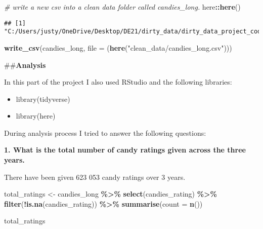 \documentclass[
]{article}
\newenvironment{Shaded}{\begin{snugshade}}{\end{snugshade}}
\newcommand{\AttributeTok}[1]{\textcolor[rgb]{0.13,0.29,0.53}{#1}}
\newcommand{\CommentTok}[1]{\textcolor[rgb]{0.56,0.35,0.01}{\textit{#1}}}
\newcommand{\FunctionTok}[1]{\textcolor[rgb]{0.13,0.29,0.53}{\textbf{#1}}}
\newcommand{\NormalTok}[1]{#1}
\newcommand{\OtherTok}[1]{\textcolor[rgb]{0.56,0.35,0.01}{#1}}
\newcommand{\SpecialCharTok}[1]{\textcolor[rgb]{0.81,0.36,0.00}{\textbf{#1}}}
\newcommand{\StringTok}[1]{\textcolor[rgb]{0.31,0.60,0.02}{#1}}
\begin{document}
\begin{Shaded}
\begin{Highlighting}[]
\CommentTok{\# write a new csv into a clean data folder called \textquotesingle{}candies\_long.\textquotesingle{}}
\NormalTok{here}\SpecialCharTok{::}\FunctionTok{here}\NormalTok{()}
\end{Highlighting}
\end{Shaded}

\begin{verbatim}
## [1] "C:/Users/justy/OneDrive/Desktop/DE21/dirty_data/dirty_data_project_codeclan_justynarosiak/task4"
\end{verbatim}

\begin{Shaded}
\begin{Highlighting}[]
\FunctionTok{write\_csv}\NormalTok{(candies\_long, }\AttributeTok{file =}\NormalTok{ (}\FunctionTok{here}\NormalTok{(}\StringTok{"clean\_data/candies\_long.csv"}\NormalTok{)))}
\end{Highlighting}
\end{Shaded}

\#\#\textbf{Analysis}

In this part of the project I also used RStudio and the following
libraries:

\begin{itemize}
\item
  library(tidyverse)
\item
  library(here)
\end{itemize}

During analysis process I tried to answer the following questions:

\textbf{1. What is the total number of candy ratings given across the
three years.}

There have been given 623 053 candy ratings over 3 years.

\begin{Shaded}
\begin{Highlighting}[]
\NormalTok{total\_ratings }\OtherTok{\textless{}{-}}\NormalTok{ candies\_long }\SpecialCharTok{\%\textgreater{}\%} \FunctionTok{select}\NormalTok{(candies\_rating) }\SpecialCharTok{\%\textgreater{}\%} 
  \FunctionTok{filter}\NormalTok{(}\SpecialCharTok{!}\FunctionTok{is.na}\NormalTok{(candies\_rating)) }\SpecialCharTok{\%\textgreater{}\%} 
 \FunctionTok{summarise}\NormalTok{(}\AttributeTok{count =} \FunctionTok{n}\NormalTok{())}

\NormalTok{total\_ratings}
\end{Highlighting}
\end{Shaded}
\end{document}
